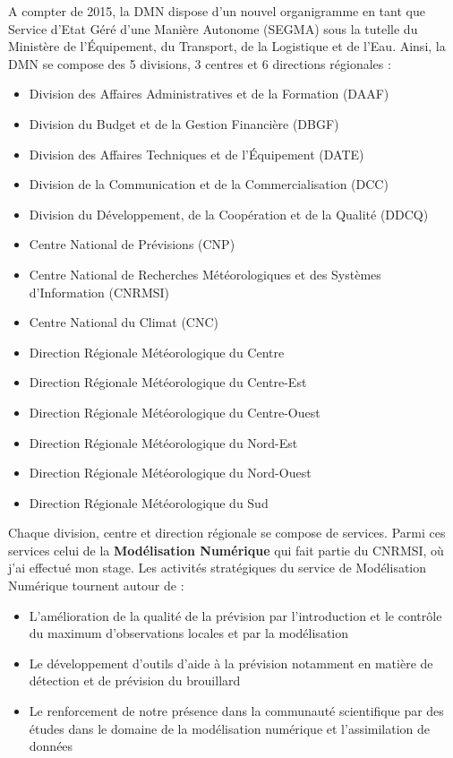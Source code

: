 A compter de 2015, la DMN dispose d’un nouvel organigramme en tant que Service d’Etat Géré d’une Manière Autonome (SEGMA) sous la tutelle du Ministère de l'Équipement, du Transport, de la Logistique et de l'Eau. Ainsi, la DMN se compose des 5 divisions, 3 centres et 6 directions régionales :
\begin{itemize}
\item[\ding{224}]  Division des Affaires Administratives et de la Formation (DAAF)
\item[\ding{224}]  Division du Budget et de la Gestion Financière (DBGF)
\item[\ding{224}]  Division des Affaires Techniques et de l’Équipement (DATE)
\item[\ding{224}]  Division de la Communication et de la Commercialisation (DCC)
\item[\ding{224}]  Division du Développement, de la Coopération et de la Qualité (DDCQ)
\item[\ding{224}]  Centre National de Prévisions (CNP)
\item[\ding{224}]  Centre National de Recherches Météorologiques et des Systèmes d’Information
(CNRMSI)
\item[\ding{224}]  Centre National du Climat (CNC)
\item[\ding{224}]  Direction Régionale Météorologique du Centre
\item[\ding{224}]  Direction Régionale Météorologique du Centre-Est
\item[\ding{224}]  Direction Régionale Météorologique du Centre-Ouest
\item[\ding{224}]  Direction Régionale Météorologique du Nord-Est
\item[\ding{224}]  Direction Régionale Météorologique du Nord-Ouest
\item[\ding{224}]  Direction Régionale Météorologique du Sud\\
\end{itemize}
 
Chaque division, centre et direction régionale se compose de services. Parmi ces services celui de la \textbf{Modélisation Numérique} qui fait partie du CNRMSI, où j'ai effectué mon stage. Les activités stratégiques du service de Modélisation Numérique tournent autour de :
 \begin{itemize}
 \item[\ding{224}] L'amélioration de la qualité de la prévision par l'introduction et le contrôle du maximum d'observations locales et par la modélisation
 \item[\ding{224}] Le développement d'outils d'aide à la prévision notamment en matière de détection et de prévision du brouillard
 \item[\ding{224}] Le renforcement de notre présence dans la communauté scientifique par des études dans le domaine de la modélisation numérique et l'assimilation de données
 \end{itemize}



